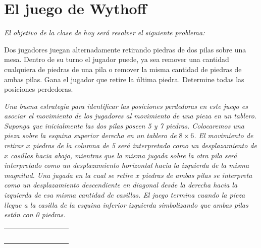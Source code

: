 
 \section{El juego de Wythoff}
 \textit{El objetivo de la clase de hoy ser\'a resolver el siguiente problema:}
 \begin{ej}
 
Dos jugadores juegan alternadamente retirando piedras de dos pilas sobre una mesa.
Dentro de su turno el jugador puede, ya sea remover una cantidad cualquiera de piedras de una pila o remover la misma cantidad de piedras de ambas pilas. Gana el jugador que retire la \'ultima piedra. Determine todas las posiciones perdedoras.    
 \end{ej}


\textit{Una buena estrategia para identificar las posiciones perdedoras en este juego es asociar el movimiento de los jugadores al movimiento de una pieza en un tablero. Suponga que inicialmente las dos pilas poseen 5 y 7 piedras. Colocaremos una pieza sobre la esquina superior derecha en un tablero de $8\times6$. El movimiento de retirar $x$ piedras de la columna de 5 ser\'a interpretado como un desplazamiento de $x$ casillas hacia abajo, mientras que la misma jugada sobre la otra pila ser\'a interpretado como un desplazamiento horizontal hacia la izquierda de la misma magnitud. Una jugada en la cual se retire $x$ piedras de ambas pilas se interpreta como un desplazamiento descendiente en diagonal desde la derecha hacia la izquierda de esa misma cantidad de casillas. El juego termina cuando la pieza llegue a la casilla de la esquina inferior izquierda simbolizando que ambas pilas est\'an con 0 piedras.}
\begin{center}
	\begin{tabular}{|p{0.01in}| p{0.01in}| p{0.01in}|p{0.01in}| p{0.01in}| p{0.01in}|p{0.01in}| p{0.01in}|} 
		\hline
	 \cellcolor[HTML]{6F6765}&\cellcolor[HTML]{6F6765}&\cellcolor[HTML]{6F6765}&\cellcolor[HTML]{6F6765}&\cellcolor[HTML]{6F6765}&\cellcolor[HTML]{6F6765}&\cellcolor[HTML]{6F6765}& \cellcolor[HTML]{1D1919} \\
		\hline
	    &  &  &  &  &  &\cellcolor[HTML]{6F6765}&\cellcolor[HTML]{6F6765}  \\[0.5ex]
		\hline
		&  &  &  &  &\cellcolor[HTML]{6F6765}&  &\cellcolor[HTML]{6F6765}  \\[0.5ex]
		\hline
		&  &  &  &\cellcolor[HTML]{6F6765}&  &  &\cellcolor[HTML]{6F6765}  \\[0.5ex]
		\hline
		&  &  &\cellcolor[HTML]{6F6765}&  &  &  &\cellcolor[HTML]{6F6765}  \\[0.5ex]
		\hline
		&  &\cellcolor[HTML]{6F6765}&  &  &  &  &\cellcolor[HTML]{6F6765}  \\[0.5ex]
		\hline
\end{tabular}
\end{center}

